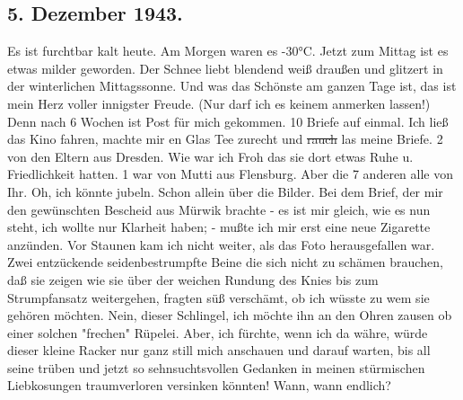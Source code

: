 \subsection{5. Dezember 1943.}

Es ist furchtbar kalt heute.
Am Morgen waren es -30°C.
Jetzt zum Mittag ist es etwas milder geworden.
Der Schnee liebt blendend wei{\ss} drau{\ss}en und glitzert in der winterlichen Mittagssonne.
Und was das Sch\"{o}nste am ganzen Tage ist, das ist mein Herz voller innigster Freude.
(Nur darf ich es keinem anmerken lassen!)
Denn nach 6 Wochen ist Post f\"{u}r mich gekommen.
10 Briefe auf einmal.
Ich lie{\ss} das Kino fahren, machte mir en Glas Tee zurecht und \st{rauch} las meine Briefe.
2 von den Eltern aus Dresden.
Wie war ich Froh das sie dort etwas Ruhe u. Friedlichkeit hatten.
1 war von Mutti aus Flensburg.
Aber die 7 anderen alle von Ihr.
Oh, ich k\"{o}nnte jubeln.
Schon allein \"{u}ber die Bilder.
Bei dem Brief, der mir den gew\"{u}nschten Bescheid aus M\"{u}rwik brachte - es ist mir gleich, wie es nun steht, ich wollte nur Klarheit haben; - mu{\ss}te ich mir erst eine neue Zigarette anz\"{u}nden.
Vor Staunen kam ich nicht weiter, als das Foto herausgefallen war.
Zwei entz\"{u}ckende seidenbestrumpfte Beine die sich nicht zu sch\"{a}men brauchen, da{\ss} sie zeigen wie sie \"{u}ber der weichen Rundung des Knies bis zum Strumpfansatz weitergehen, fragten s\"{u}{\ss} versch\"{a}mt, ob ich w\"{u}sste zu wem sie geh\"{o}ren m\"{o}chten.
Nein, dieser Schlingel, ich m\"{o}chte ihn an den Ohren zausen ob einer solchen "frechen" R\"{u}pelei.
Aber, ich f\"{u}rchte, wenn ich da w\"{a}hre, w\"{u}rde dieser kleine Racker nur ganz still mich anschauen und darauf warten, bis all seine tr\"{u}ben und jetzt so sehnsuchtsvollen Gedanken in meinen st\"{u}rmischen Liebkosungen traumverloren versinken k\"{o}nnten!
Wann, wann endlich?

\clearpage
